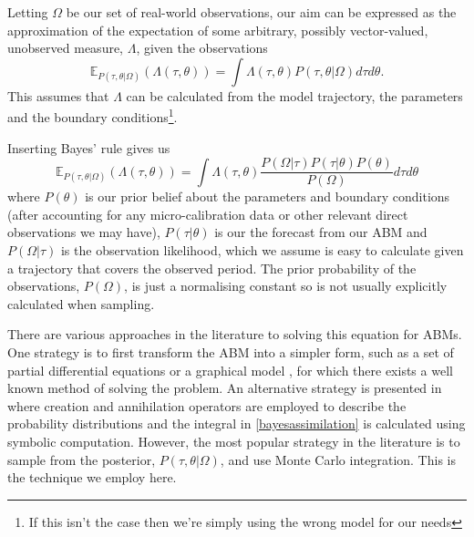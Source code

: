 \documentclass{article}
\begin{document}
Letting $\Omega$ be our set of real-world observations, our aim can be expressed as the approximation of the expectation of some arbitrary, possibly vector-valued, unobserved measure, $\Lambda$, given the observations
\begin{equation}
\mathbb{E}_{P(\tau,\theta|\Omega)}(\Lambda(\tau,\theta)) = \int \Lambda(\tau,\theta) P(\tau,\theta|\Omega) d\tau d\theta.
\label{expectation}
\end{equation}
This assumes that $\Lambda$ can be calculated from the model trajectory, the parameters and the boundary conditions\footnote{If this isn't the case then we're simply using the wrong model for our needs}. 

Inserting Bayes' rule gives us
\begin{equation}
\mathbb{E}_{P(\tau,\theta|\Omega)}(\Lambda(\tau,\theta)) = \int \Lambda(\tau,\theta) \frac{P(\Omega|\tau)P(\tau|\theta)P(\theta)}{P(\Omega)} d\tau d\theta
\label{bayesassimilation}
\end{equation}
where $P(\theta)$ is our prior belief about the parameters and boundary conditions (after accounting for any micro-calibration data or other relevant direct observations we may have), $P(\tau|\theta)$ is our the forecast from our ABM and $P(\Omega|\tau)$ is the observation likelihood, which we assume is easy to calculate given a trajectory that covers the observed period. The prior probability of the observations, $P(\Omega)$, is just a normalising constant so is not usually explicitly calculated when sampling.

There are various approaches in the literature to solving this equation for ABMs. One strategy is to first transform the ABM into a simpler form, such as a set of partial differential equations \citep{lloyd_exploring_2016} or a graphical model \citep{liao2010integrated}, for which there exists a well known method of solving the problem. An alternative strategy is presented in \citet{tang2019data} where creation and annihilation operators are employed to describe the probability distributions and the integral in \eqref{bayesassimilation} is calculated using symbolic computation. However, the most popular strategy in the literature is to sample from the posterior, $P(\tau,\theta|\Omega)$, and use Monte Carlo integration. This is the technique we employ here.
\end{document}
